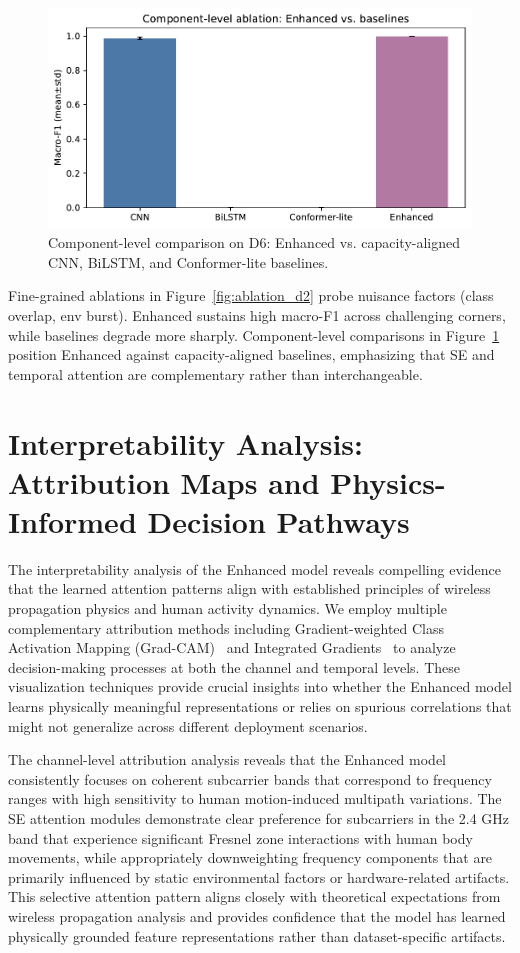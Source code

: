 \documentclass[journal]{IEEEtran}
\begin{document}
\begin{figure}[t]
\centering
\includegraphics[width=\columnwidth]{plots/ablation_components.pdf}
\caption{Component-level comparison on D6: Enhanced vs. capacity-aligned CNN, BiLSTM, and Conformer-lite baselines.}
\label{fig:ablation_components}
\end{figure}

Fine-grained ablations in Figure~\ref{fig:ablation_d2} probe nuisance factors (class overlap, env burst). Enhanced sustains high macro-F1 across challenging corners, while baselines degrade more sharply. Component-level comparisons in Figure~\ref{fig:ablation_components} position Enhanced against capacity-aligned baselines, emphasizing that SE and temporal attention are complementary rather than interchangeable.

\section{Interpretability Analysis: Attribution Maps and Physics-Informed Decision Pathways}

The interpretability analysis of the Enhanced model reveals compelling evidence that the learned attention patterns align with established principles of wireless propagation physics and human activity dynamics. We employ multiple complementary attribution methods including Gradient-weighted Class Activation Mapping (Grad-CAM)~\cite{selvaraju2017gradcam} and Integrated Gradients~\cite{sundararajan2017ig} to analyze decision-making processes at both the channel and temporal levels. These visualization techniques provide crucial insights into whether the Enhanced model learns physically meaningful representations or relies on spurious correlations that might not generalize across different deployment scenarios.

The channel-level attribution analysis reveals that the Enhanced model consistently focuses on coherent subcarrier bands that correspond to frequency ranges with high sensitivity to human motion-induced multipath variations. The SE attention modules demonstrate clear preference for subcarriers in the 2.4 GHz band that experience significant Fresnel zone interactions with human body movements, while appropriately downweighting frequency components that are primarily influenced by static environmental factors or hardware-related artifacts. This selective attention pattern aligns closely with theoretical expectations from wireless propagation analysis and provides confidence that the model has learned physically grounded feature representations rather than dataset-specific artifacts.
\end{document}
